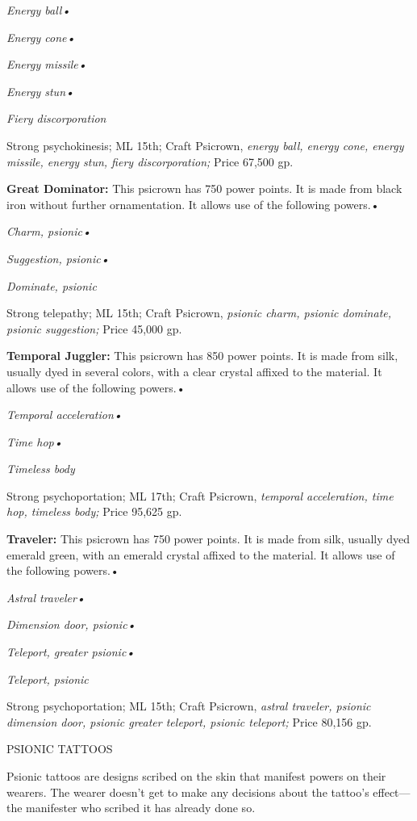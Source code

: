 \documentclass{article}
\begin{document}
\textit{Energy ball• }

\textit{Energy cone• }

\textit{Energy missile• }

\textit{Energy stun• }

\textit{Fiery discorporation}

Strong psychokinesis; ML 15th; Craft Psicrown, \textit{energy ball, energy cone, 
energy missile, energy stun, fiery discorporation;  }Price 67,500 gp.

\textbf{Great Dominator:} This psicrown has 750 power points. It is made from black 
iron without further ornamentation. It allows use of the following powers.• 

\textit{Charm, psionic• }

\textit{Suggestion, psionic• }

\textit{Dominate, psionic}

Strong telepathy; ML 15th; Craft Psicrown, \textit{psionic charm, psionic dominate, 
psionic suggestion; }Price 45,000 gp.

\textbf{Temporal Juggler:} This psicrown has 850 power points. It is made from 
silk, usually dyed in several colors, with a clear crystal affixed to the material. 
It allows use of the following powers.• 

\textit{Temporal acceleration• }

\textit{Time hop• }

\textit{Timeless body}

Strong psychoportation; ML 17th; Craft Psicrown, \textit{temporal acceleration, 
time hop, timeless body; }Price 95,625 gp. 

\textbf{Traveler: }This psicrown has 750 power points. It is made from silk, usually 
dyed emerald green, with an emerald crystal affixed to the material. It allows 
use of the following powers.• 

\textit{Astral traveler• }

\textit{Dimension door, psionic• }

\textit{Teleport, greater psionic• }

\textit{Teleport, psionic}

Strong psychoportation; ML 15th; Craft Psicrown, \textit{astral traveler, psionic 
dimension door, psionic greater teleport, psionic teleport; }Price 80,156 gp.

\vspace{12pt}
PSIONIC TATTOOS

Psionic tattoos are designs scribed on the skin that manifest powers on their wearers. 
The wearer doesn't get to make any decisions about the tattoo's effect---the manifester 
who scribed it has already done so.
\end{document}
